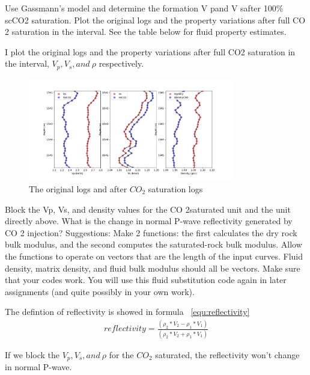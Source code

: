 \begin{problem}{3}
    Use Gassmann’s model and determine the formation V pand V safter 100\% scCO2 saturation. Plot the original logs and the property variations after full CO 2 saturation in the interval. See the table below for fluid property estimates.
\end{problem}

\begin{solution}

    I plot the original logs and the property variations after full CO2 saturation in the interval, $V_p, V_s, and \ \rho$ respectively.
    \begin{figure}[H]
        \centering
        \includegraphics[width=0.8\textwidth]{figures/homework-1/p2-problem-3.pdf}
        \caption{The original logs and after $CO_2$ saturation logs}
        \label{fig:co2-saturation}
    \end{figure}
\end{solution}

\begin{problem}{4}
    Block the Vp, Vs, and density values for the CO 2saturated unit and the unit directly above. What is the change in normal P-wave reflectivity generated by CO 2 injection?
    Suggestions: Make 2 functions: the first calculates the dry rock bulk modulus, and the second computes the saturated-rock bulk modulus. Allow the functions to operate on vectors that are the length of the input curves. Fluid density, matrix density, and fluid bulk modulus should all be vectors. Make sure that your codes work. You will use this fluid substitution code again in later assignments (and quite possibly in your own work).
\end{problem}

\begin{solution}

    The defintion of reflectivity is showed in formula ~\ref{equ:reflectivity}
    \begin{align}
        reflectivity = \frac{(\rho_2*V_2 - \rho_1*V_1) }{ (\rho_2*V_2 + \rho_1*V_1)}
        \label{equ:reflectivity}
    \end{align}

    If we block the $V_p, V_s, and \ \rho$ for the $CO_2$ saturated, the reflectivity won't change in normal P-wave.
\end{solution}


